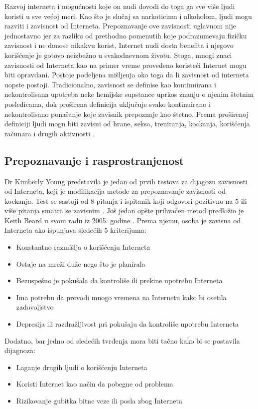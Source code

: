 \documentclass[a4paper]{article}
\begin{document}
Razvoj interneta i mogućnosti koje on nudi dovodi do toga ga sve više ljudi koristi u sve većoj meri.
Kao što je slučaj sa narkoticima i alkoholom, ljudi mogu razviti i zavisnost od Interneta. Prepoznavanje ove zavisnosti uglavnom nije jednostavno jer za razliku od prethodno pomenutih koje podrazumevaju fizičku zavisnost i ne donose nikakvu korist, Internet nudi dosta benefita i njegovo korišćenje je gotovo neizbežno u svakodnevnom životu. Stoga, mnogi znaci zavisnosti od Interneta kao na primer vreme provedeno koristeći Internet mogu biti opravdani. Postoje podeljena mišljenja oko toga da li zavisnost od interneta uopste postoji. Tradicionalno, zavisnost se definise kao kontinuirana i nekontrolisana upotreba neke hemijske supstance uprkos znanju o njenim štetnim posledicama, dok proširena definicija uključuje svako  kontinuirano i nekontrolisano ponašanje koje zavisnik prepoznaje kao štetno. Prema proširenoj definiciji ljudi mogu biti zavisni od hrane, seksa, treniranja, kockanja, korišćenja računara i drugih aktivnosti \cite{ethics}.

\subsection{Prepoznavanje i rasprostranjenost}
\label{subsec:podnaslovZI1}

Dr Kimberly Young predstavila je jedan od prvih testova za dijagozu zavisnosti od Interneta, koji je modifikacija metode za prepoznavanje zavisnosti od kockanja. Test se sastoji od 8 pitanja i ispitanik koji odgovori pozitivno na 5 ili više pitanja smatra se zavisnim \cite{ethics}.
Još jedan opšte prihvaćen metod predložio je Keith Beard u svom radu iz 2005. godine \cite{diagnostic}. Prema njemu, osoba je zavisna od Interneta ako ispunjava sledećih 5 kriterijuma:
\begin{itemize}
  \item Konstantno razmišlja o korišćenju Interneta
  \item Ostaje na mreži duže nego što je planirala
  \item Bezuspešno je pokušala da kontroliše ili prekine upotrebu Interneta
  \item Ima potrebu da provodi mnogo vremena na Internetu kako bi osetila zadovoljstvo
  \item Depresija ili razdražljivost pri pokušaju da kontroliše upotrebu Interneta
\end{itemize}

Dodatno, bar jedno od sledećih tvrđenja mora biti tačno kako bi se postavila dijagnoza:
\begin{itemize}
  \item Laganje drugih ljudi o korišćenju Interneta
  \item Koristi Internet kao način da pobegne od problema
  \item Rizikovanje gubitka bitne veze ili posla zbog Interneta
\end{itemize}
\end{document}
